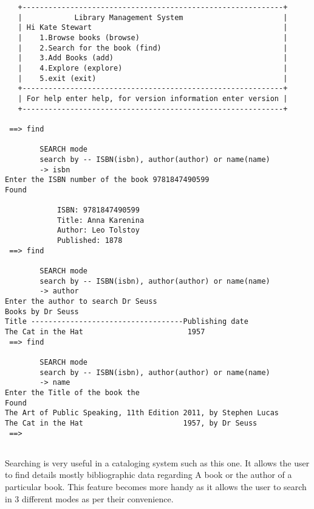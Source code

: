 \documentclass[12pt, a4paper, titlepage, openany]{report}
\begin{document}
\begin{verbatim}
   +------------------------------------------------------------+
   |            Library Management System                       |
   | Hi Kate Stewart                                            |
   |    1.Browse books (browse)                                 |
   |    2.Search for the book (find)                            |
   |    3.Add Books (add)                                       |
   |    4.Explore (explore)                                     |
   |    5.exit (exit)                                           |
   +------------------------------------------------------------+
   | For help enter help, for version information enter version |
   +------------------------------------------------------------+
    
 ==> find

        SEARCH mode
        search by -- ISBN(isbn), author(author) or name(name)
        -> isbn
Enter the ISBN number of the book 9781847490599
Found

            ISBN: 9781847490599
            Title: Anna Karenina
            Author: Leo Tolstoy
            Published: 1878
 ==> find

        SEARCH mode
        search by -- ISBN(isbn), author(author) or name(name)
        -> author
Enter the author to search Dr Seuss
Books by Dr Seuss
Title -----------------------------------Publishing date
The Cat in the Hat                        1957
 ==> find

        SEARCH mode
        search by -- ISBN(isbn), author(author) or name(name)
        -> name
Enter the Title of the book the
Found
The Art of Public Speaking, 11th Edition 2011, by Stephen Lucas
The Cat in the Hat                       1957, by Dr Seuss
 ==> 


\end{verbatim}
Searching is very useful in a cataloging system such as this one. It allows the user to find details mostly bibliographic data regarding A book or the author of a particular book. This feature becomes more handy as it allows the user to search in 3 different modes as per their convenience.
\newpage
\end{document}
